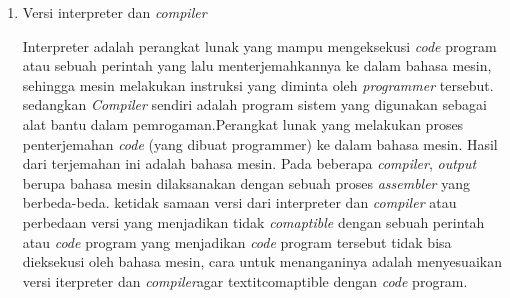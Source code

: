 \begin{enumerate}
\begin{enumerate}
\end{enumerate}
\item Versi interpreter dan \textit{compiler}
\par
Interpreter adalah perangkat lunak yang mampu mengeksekusi \textit{code} program atau sebuah perintah yang lalu menterjemahkannya ke dalam bahasa mesin, sehingga mesin melakukan instruksi yang diminta oleh \textit{programmer} tersebut. sedangkan \textit{Compiler} sendiri adalah program sistem yang digunakan sebagai alat bantu dalam pemrogaman.Perangkat lunak yang melakukan proses penterjemahan \textit{code} (yang dibuat programmer) ke dalam bahasa mesin. Hasil dari terjemahan ini adalah bahasa mesin. Pada beberapa \textit{compiler}, \textit{output} berupa bahasa mesin dilaksanakan dengan sebuah proses \textit{assembler} yang berbeda-beda. ketidak samaan versi dari interpreter dan \textit{compiler} atau perbedaan versi yang menjadikan tidak \textit{comaptible} dengan sebuah perintah atau \textit{code} program yang menjadikan \textit{code} program tersebut tidak bisa dieksekusi oleh bahasa mesin, cara untuk menanganinya adalah menyesuaikan versi iterpreter dan \textit{compiler}agar textit{comaptible} dengan \textit{code} program.
\end{enumerate}

